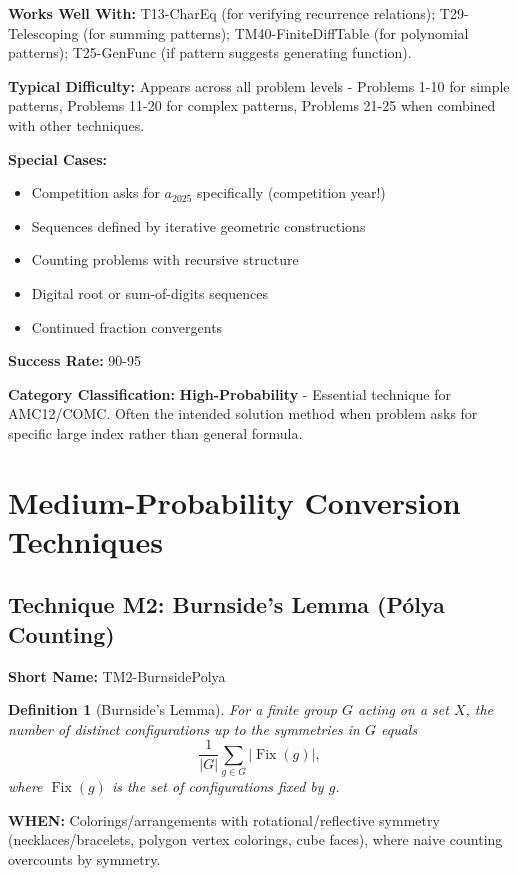 \documentclass[12pt]{article}
\newtheorem{definition}{Definition}[section]
\begin{document}
\textbf{Works Well With:} T13-CharEq (for verifying recurrence relations); T29-Telescoping (for summing patterns); TM40-FiniteDiffTable (for polynomial patterns); T25-GenFunc (if pattern suggests generating function).

\textbf{Typical Difficulty:} Appears across all problem levels - Problems 1-10 for simple patterns, Problems 11-20 for complex patterns, Problems 21-25 when combined with other techniques.

\textbf{Special Cases:} 
\begin{itemize}
    \item Competition asks for $a_{2025}$ specifically (competition year!)
    \item Sequences defined by iterative geometric constructions
    \item Counting problems with recursive structure
    \item Digital root or sum-of-digits sequences
    \item Continued fraction convergents
\end{itemize}

\textbf{Success Rate:} 90-95%

\textbf{Category Classification:} \textbf{High-Probability} - Essential technique for AMC12/COMC. Often the intended solution method when problem asks for specific large index rather than general formula.

\section{Medium-Probability Conversion Techniques}

\subsection{Technique M2: Burnside's Lemma (P\'olya Counting)}
\textbf{Short Name:} TM2-BurnsidePolya

\begin{definition}[Burnside's Lemma]
For a finite group $G$ acting on a set $X$, the number of distinct configurations up to the symmetries in $G$ equals
\[ \frac{1}{|G|} \sum_{g\in G} \big|\operatorname{Fix}(g)\big|, \]
where $\operatorname{Fix}(g)$ is the set of configurations fixed by $g$.
\end{definition}

\textbf{WHEN:} Colorings/arrangements with rotational/reflective symmetry (necklaces/bracelets, polygon vertex colorings, cube faces), where naive counting overcounts by symmetry.
\end{document}
